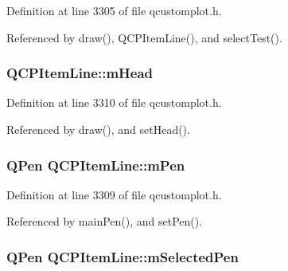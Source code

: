 Definition at line 3305 of file qcustomplot.\+h.



Referenced by draw(), Q\+C\+P\+Item\+Line(), and select\+Test().

\hypertarget{class_q_c_p_item_line_a51603f28ab7ddb1c1a95ea384791d3ed}{}
\subsubsection[{m\+Head}]{ Q\+C\+P\+Item\+Line\+::m\+Head\hspace{0.3cm}{\ttfamily [protected]}}\label{class_q_c_p_item_line_a51603f28ab7ddb1c1a95ea384791d3ed}


Definition at line 3310 of file qcustomplot.\+h.



Referenced by draw(), and set\+Head().

\hypertarget{class_q_c_p_item_line_abbb544d5bb927dfe4e81a7f3ca4c65ac}{}
\subsubsection[{m\+Pen}]{\setlength{\rightskip}{0pt plus 5cm}Q\+Pen Q\+C\+P\+Item\+Line\+::m\+Pen\hspace{0.3cm}{\ttfamily [protected]}}\label{class_q_c_p_item_line_abbb544d5bb927dfe4e81a7f3ca4c65ac}


Definition at line 3309 of file qcustomplot.\+h.



Referenced by main\+Pen(), and set\+Pen().

\hypertarget{class_q_c_p_item_line_aff858ad6dde3b90024814ca4b116f278}{}
\subsubsection[{m\+Selected\+Pen}]{\setlength{\rightskip}{0pt plus 5cm}Q\+Pen Q\+C\+P\+Item\+Line\+::m\+Selected\+Pen\hspace{0.3cm}{\ttfamily [protected]}}\label{class_q_c_p_item_line_aff858ad6dde3b90024814ca4b116f278}


